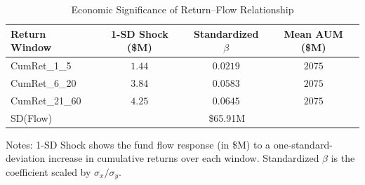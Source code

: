 \begin{table}[htbp]\centering
\caption{Economic Significance of Return--Flow Relationship}
\label{tab:econ_sig}
\begin{tabular}{lccc}
\toprule
Return Window & 1-SD Shock (\$M) & Standardized $\beta$ & Mean AUM (\$M) \\
\midrule
CumRet\_1\_5 & $1.44$ & $0.0219$ & $2075$ \\
CumRet\_6\_20 & $3.84$ & $0.0583$ & $2075$ \\
CumRet\_21\_60 & $4.25$ & $0.0645$ & $2075$ \\
\midrule
SD(Flow) & \multicolumn{3}{c}{\$65.91M} \\
\bottomrule
\end{tabular}
\begin{tablenotes}\small
\item Notes: 1-SD Shock shows the fund flow response (in \$M) to a
one-standard-deviation increase in cumulative returns over each window.
Standardized $\beta$ is the coefficient scaled by $\sigma_x / \sigma_y$.
\end{tablenotes}
\end{table}